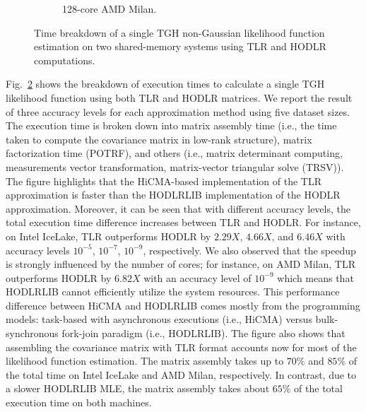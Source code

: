 \documentclass[conference]{IEEEtran}
\begin{document}
\begin{figure}
\begin{subfigure}[b]{0.42\textwidth}
     \caption{128-core AMD Milan.}
     \label{fig:tlrhodlr-kanary}
    \end{subfigure}
     \caption{Time breakdown of a single TGH non-Gaussian likelihood function estimation on two shared-memory systems using TLR and HODLR computations.}
       \label{fig:tlr-vs-hodlr}
     \end{figure}
     
     

Fig.~\ref{fig:tlr-vs-hodlr} shows the breakdown of execution times to
calculate a single TGH likelihood function using both TLR
and HODLR matrices. We report the result of three
accuracy levels for each approximation method using
five dataset sizes. The execution time is broken down into matrix assembly time
(i.e., the time taken to compute the covariance matrix in low-rank structure), matrix factorization time (POTRF), and
others (i.e., matrix determinant computing, measurements vector
transformation, matrix-vector triangular solve (TRSV)).  
The figure highlights that the HiCMA-based
implementation of the TLR approximation is faster than
the HODLRLIB implementation of the HODLR approximation.
Moreover, it can be seen that with different accuracy levels, the total
execution time difference increases between TLR and HODLR. For instance, on Intel IceLake, TLR outperforms HODLR by $2.29X$, $4.66X$, and $6.46X$ with accuracy levels $10^{-5}$, $10^{-7}$, $10^{-9}$, respectively. We also observed that the speedup is strongly influenced by the number of cores; for instance, on AMD Milan, TLR 
outperforms HODLR by $6.82X$ with an accuracy level of $10^{-9}$ which means that HODLRLIB cannot efficiently utilize the 
system resources. This performance difference between HiCMA and HODLRLIB comes mostly
from the programming models: task-based with asynchronous executions (i.e., HiCMA) versus
bulk-synchronous fork-join paradigm (i.e., HODLRLIB).
The figure also shows that assembling the covariance 
matrix with TLR format accounts now for most of the 
likelihood function estimation. The matrix assembly takes up to 
$70\%$ and $85\%$ of the total time on Intel IceLake and AMD Milan, respectively. 
In contrast, due to a slower HODLRLIB MLE, 
the matrix assembly takes about $65\%$ of the total execution time on 
both machines. 
\end{document}
